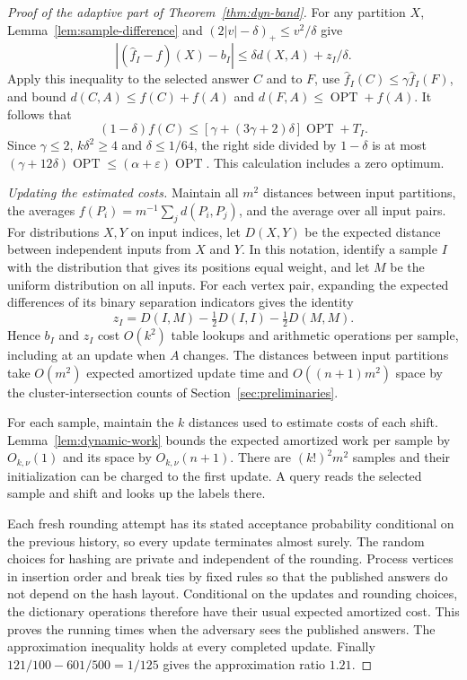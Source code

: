 \documentclass[11pt]{article}
\begin{document}
\begin{proof}[Proof of the adaptive part of Theorem~\ref{thm:dyn-band}]
For any partition $X$, Lemma~\ref{lem:sample-difference} and
$(2|v|-\delta)_+\le v^2/\delta$ give
\[
 |(\widehat f_I-f)(X)-b_I|\le\delta d(X,A)+z_I/\delta .
\]
Apply this inequality to the selected answer $C$ and to $F$, use
$\widehat f_I(C)\le\gamma\widehat f_I(F)$, and bound
$d(C,A)\le f(C)+f(A)$ and $d(F,A)\le\operatorname{OPT}+f(A)$. It follows that
\[
 (1-\delta)f(C)\le[\gamma+(3\gamma+2)\delta]\operatorname{OPT}+T_I .
\]
Since $\gamma\le2$, $k\delta^2\ge4$ and $\delta\le1/64$, the right
side divided by $1-\delta$ is at most
$(\gamma+12\delta)\operatorname{OPT}\le(\alpha+\varepsilon)\operatorname{OPT}$.
This calculation includes a zero optimum.

\emph{Updating the estimated costs.}
Maintain all $m^2$ distances between input partitions, the averages
$f(P_i)=m^{-1}\sum_j d(P_i,P_j)$, and the average over all input pairs. For distributions $X,Y$ on input indices,
let $D(X,Y)$ be the expected distance between independent inputs from
$X$ and $Y$. In this notation, identify a sample $I$ with the distribution
that gives its positions equal weight, and let $M$ be the uniform
distribution on all inputs. For each vertex pair, expanding the expected
differences of its binary separation indicators gives the identity
\[
 z_I=D(I,M)-\tfrac12D(I,I)-\tfrac12D(M,M).
\]
Hence $b_I$ and $z_I$ cost $O(k^2)$ table lookups and arithmetic
operations per sample, including at an update when $A$ changes. The
distances between input partitions take $O(m^2)$ expected amortized update time
and $O((n+1)m^2)$ space by the cluster-intersection counts of
Section~\ref{sec:preliminaries}.

For each sample, maintain the $k$ distances used to estimate costs of each shift.
Lemma~\ref{lem:dynamic-work} bounds the expected amortized work
per sample by $O_{k,\nu}(1)$ and its space by $O_{k,\nu}(n+1)$.
There are $(k!)^2m^2$ samples and their initialization can be
charged to the first update. A query reads the selected sample
and shift and looks up the labels there.

Each fresh rounding attempt has its stated acceptance probability
conditional on the previous history, so every update terminates
almost surely. The random choices for hashing are private and independent of the
rounding. Process vertices in insertion order and break ties by fixed
rules so that the published answers do not depend on the hash layout.
Conditional on the updates and rounding choices, the dictionary
operations therefore have their usual expected amortized cost.
This proves the running times when the adversary sees the published
answers. The approximation inequality holds at every completed
update. Finally $121/100-601/500=1/125$ gives the approximation ratio $1.21$.
\end{proof}
\end{document}
